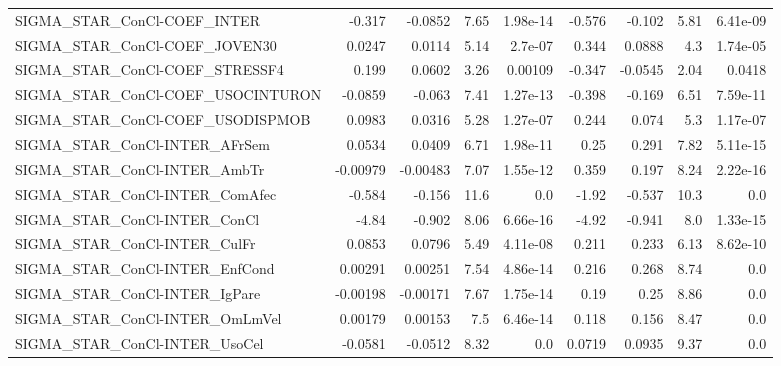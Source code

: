 \begin{tabular}{lrrrrrrrr}
SIGMA\_STAR\_ConCl-COEF\_INTER           &      -0.317 &      -0.0852 &     7.65 & 1.98e-14 &     -0.576 &      -0.102 &         5.81 &      6.41e-09 \\
SIGMA\_STAR\_ConCl-COEF\_JOVEN30         &      0.0247 &       0.0114 &     5.14 &  2.7e-07 &      0.344 &      0.0888 &          4.3 &      1.74e-05 \\
SIGMA\_STAR\_ConCl-COEF\_STRESSF4        &       0.199 &       0.0602 &     3.26 &  0.00109 &     -0.347 &     -0.0545 &         2.04 &        0.0418 \\
SIGMA\_STAR\_ConCl-COEF\_USOCINTURON     &     -0.0859 &       -0.063 &     7.41 & 1.27e-13 &     -0.398 &      -0.169 &         6.51 &      7.59e-11 \\
SIGMA\_STAR\_ConCl-COEF\_USODISPMOB      &      0.0983 &       0.0316 &     5.28 & 1.27e-07 &      0.244 &       0.074 &          5.3 &      1.17e-07 \\
SIGMA\_STAR\_ConCl-INTER\_AFrSem         &      0.0534 &       0.0409 &     6.71 & 1.98e-11 &       0.25 &       0.291 &         7.82 &      5.11e-15 \\
SIGMA\_STAR\_ConCl-INTER\_AmbTr          &    -0.00979 &     -0.00483 &     7.07 & 1.55e-12 &      0.359 &       0.197 &         8.24 &      2.22e-16 \\
SIGMA\_STAR\_ConCl-INTER\_ComAfec        &      -0.584 &       -0.156 &     11.6 &      0.0 &      -1.92 &      -0.537 &         10.3 &           0.0 \\
SIGMA\_STAR\_ConCl-INTER\_ConCl          &       -4.84 &       -0.902 &     8.06 & 6.66e-16 &      -4.92 &      -0.941 &          8.0 &      1.33e-15 \\
SIGMA\_STAR\_ConCl-INTER\_CulFr          &      0.0853 &       0.0796 &     5.49 & 4.11e-08 &      0.211 &       0.233 &         6.13 &      8.62e-10 \\
SIGMA\_STAR\_ConCl-INTER\_EnfCond        &     0.00291 &      0.00251 &     7.54 & 4.86e-14 &      0.216 &       0.268 &         8.74 &           0.0 \\
SIGMA\_STAR\_ConCl-INTER\_IgPare         &    -0.00198 &     -0.00171 &     7.67 & 1.75e-14 &       0.19 &        0.25 &         8.86 &           0.0 \\
SIGMA\_STAR\_ConCl-INTER\_OmLmVel        &     0.00179 &      0.00153 &      7.5 & 6.46e-14 &      0.118 &       0.156 &         8.47 &           0.0 \\
SIGMA\_STAR\_ConCl-INTER\_UsoCel         &     -0.0581 &      -0.0512 &     8.32 &      0.0 &     0.0719 &      0.0935 &         9.37 &           0.0 \\

\end{tabular}
